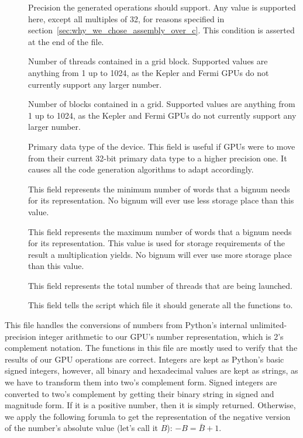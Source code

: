 \documentclass[12pt, a4paper]{report}
\begin{document}
\begin{sloppypar}
\begin{description}
\begin{description}
\item[] Precision the generated operations should support.
Any value is supported here, except all multiples of 32, for reasons specified
in section~\ref{sec:why_we_chose_assembly_over_c}.
This condition is asserted at the end of the file.
\item[] Number of threads contained in a grid block.
Supported values are anything from 1 up to 1024, as the Kepler and Fermi GPUs do not currently
support any larger number.
\item[] Number of blocks contained in a grid.
Supported values are anything from 1 up to 1024, as the Kepler and Fermi GPUs do not currently
support any larger number.
\item[] Primary data type of the device.
This field is useful if GPUs were to move from their current  32-bit primary
data type to a higher precision one.
It causes all the code generation algorithms to adapt accordingly.
\item[] This field represents the minimum number
of words that a bignum needs for its representation.
No bignum will ever use less storage place than this value.
\item[] This field represents the maximum number
of words that a bignum needs for its representation.
This value is used for storage requirements of the result a multiplication
yields.
No bignum will ever use more storage place than this value.
\item[] This field represents the total number of threads
that are being launched.
\item[] This field tells the script which file it
should generate all the functions to.
\end{description}

\item[\Q{conversions.py}]
This file handles the conversions of numbers from Python's internal
unlimited-precision integer arithmetic to our GPU's number representation, which
is 2's complement notation.
The functions in this file are mostly used to verify that the results of our GPU
operations are correct.
Integers are kept as Python's basic signed integers, however, all binary and
hexadecimal values are kept as strings, as we have to transform them into two's
complement form.
Signed integers are converted to two's complement by getting their binary string
in signed and magnitude form.
If it is a positive number, then it is simply returned.
Otherwise, we apply the following forumla to get the representation of the
negative version of the number's absolute value (let's call it $B$):
$-B = \bar{B} + 1$.


\end{description}
\end{sloppypar}
\end{document}
